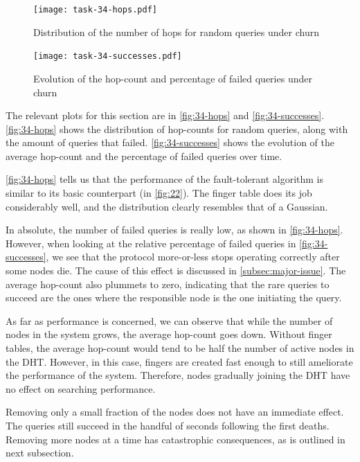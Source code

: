 \documentclass[11pt,a4paper,parskip=half]{scrartcl}
\begin{document}
\begin{figure}
	\centering
	\texttt{[image: task-34-hops.pdf]}
	\caption{Distribution of the number of hops for random queries under churn}
	\label{fig:34-hops}
\end{figure}

\begin{figure}
	\centering
	\texttt{[image: task-34-successes.pdf]}
	\caption{Evolution of the hop-count and percentage of failed queries under churn}
	\label{fig:34-successes}
\end{figure}

The relevant plots for this section are in \autoref{fig:34-hops} and \autoref{fig:34-successes}.
\autoref{fig:34-hops} shows the distribution of hop-counts for random queries, along with the amount of queries that failed.
\autoref{fig:34-successes} shows the evolution of the average hop-count and the percentage of failed queries over time.

\autoref{fig:34-hops} tells us that the performance of the fault-tolerant algorithm is similar to its basic counterpart (in \autoref{fig:22}).
The finger table does its job considerably well, and the distribution clearly resembles that of a Gaussian.

In absolute, the number of failed queries is really low, as shown in \autoref{fig:34-hops}.
However, when looking at the relative percentage of failed queries in \autoref{fig:34-successes}, we see that the protocol more-or-less stops operating correctly after some nodes die.
The cause of this effect is discussed in \autoref{subsec:major-issue}.
The average hop-count also plummets to zero, indicating that the rare queries to succeed are the ones where the responsible node is the one initiating the query.

As far as performance is concerned, we can observe that while the number of nodes in the system grows, the average hop-count goes down.
Without finger tables, the average hop-count would tend to be half the number of active nodes in the DHT.
However, in this case, fingers are created fast enough to still ameliorate the performance of the system.
Therefore, nodes gradually joining the DHT have no effect on searching performance.

Removing only a small fraction of the nodes does not have an immediate effect.
The queries still succeed in the handful of seconds following the first deaths.
Removing more nodes at a time has catastrophic consequences, as is outlined in next subsection.
\end{document}

